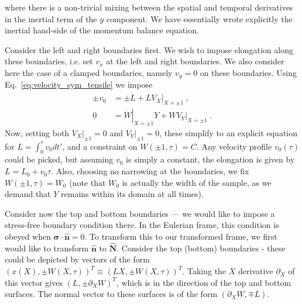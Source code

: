 \documentclass[12pt,a4paper]{article}
\begin{document}
where there is a non-trivial mixing between the spatial and temporal derivatives in the inertial term of the $y$ component. We have essentially wrote explicitly the inertial hand-side of the momentum balance equation.

Consider the left and right boundaries first. We wish to impose elongation along these boundaries, i.e. set $v_x$ at the left and right boundaries. We also consider here the case of a clamped boundaries, namely $v_y = 0$ on these boundaries. Using Eq.~\eqref{eq:velocity_sym_tensile} we impose
\begin{equation}\label{eq:velocity_x_bounds_sym_tensile}
  \begin{split}
     \pm v_0 & = \pm \dot{L} + L \left.V_X\right|_{X=\pm1} \ , \\
      0 & = \left.\dot{W}\right|_{X=\pm1} Y + \left. W V_Y\right|_{X=\pm1} \ .
  \end{split}
\end{equation}
Now, setting both $\left.V_X\right|_{\pm 1}=0$ and $\left.V_Y\right|_{\pm 1}=0$, these simplify to an explicit equation for $L=\int_0^\tau v_0 dt'$, and a constraint on $W\left(\pm1,\tau\right)=C$. Any velocity profile $v_0\left(\tau\right)$ could be picked, but assuming $v_0$ is simply a constant, the elongation is given by $L=L_0 + v_0 \tau$. Also, choosing no narrowing at the boundaries, we fix $W\left(\pm1,\tau\right)=W_0$ (note that $W_0$ is actually the width of the sample, as we demand that $Y$ remains within its domain at all times).

Consider now the top and bottom boundaries --- we would like to impose a stress-free boundary condition there. In the Eulerian frame, this condition is obeyed when $\bm{\sigma}\cdot\hat{\bm{n}}=0$. To transform this to our transformed frame, we first would like to transform $\hat{\bm{n}}$ to $\hat{\bm{N}}$. Consider the top (bottom) boundaries - these could be depicted by vectors of the form $\left(x\left(X\right),\pm W\left(X,\tau\right)\right)^{T}\equiv\left(L X,\pm W\left(X,\tau\right)\right)^{T}$. Taking the $X$ derivative $\partial_X$ of this vector gives $\left(L,\pm \partial_X W\right)^{T}$, which is in the direction of the top and bottom surfaces. The normal vector to these surfaces is of the form $\left(\partial_X W, \mp L\right)$.
\end{document}
